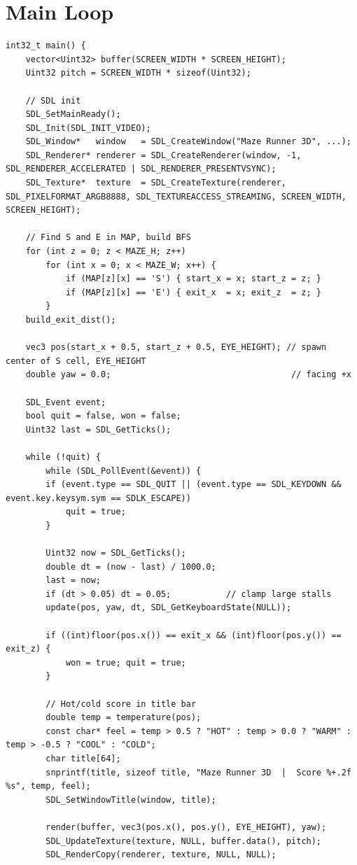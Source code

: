 {{{{{{\section{Main Loop}
\label{sec:mainloop}
\begin{verbatim}
int32_t main() {
    vector<Uint32> buffer(SCREEN_WIDTH * SCREEN_HEIGHT);
    Uint32 pitch = SCREEN_WIDTH * sizeof(Uint32);

    // SDL init
    SDL_SetMainReady();
    SDL_Init(SDL_INIT_VIDEO);
    SDL_Window*   window   = SDL_CreateWindow("Maze Runner 3D", ...);
    SDL_Renderer* renderer = SDL_CreateRenderer(window, -1, SDL_RENDERER_ACCELERATED | SDL_RENDERER_PRESENTVSYNC);
    SDL_Texture*  texture  = SDL_CreateTexture(renderer, SDL_PIXELFORMAT_ARGB8888, SDL_TEXTUREACCESS_STREAMING, SCREEN_WIDTH, SCREEN_HEIGHT);

    // Find S and E in MAP, build BFS
    for (int z = 0; z < MAZE_H; z++)
        for (int x = 0; x < MAZE_W; x++) {
            if (MAP[z][x] == 'S') { start_x = x; start_z = z; }
            if (MAP[z][x] == 'E') { exit_x  = x; exit_z  = z; }
        }
    build_exit_dist();

    vec3 pos(start_x + 0.5, start_z + 0.5, EYE_HEIGHT); // spawn center of S cell, EYE_HEIGHT
    double yaw = 0.0;                                    // facing +x

    SDL_Event event;
    bool quit = false, won = false;
    Uint32 last = SDL_GetTicks();

    while (!quit) {
        while (SDL_PollEvent(&event)) {
        if (event.type == SDL_QUIT || (event.type == SDL_KEYDOWN && event.key.keysym.sym == SDLK_ESCAPE))
            quit = true;
        }

        Uint32 now = SDL_GetTicks();
        double dt = (now - last) / 1000.0;
        last = now;
        if (dt > 0.05) dt = 0.05;           // clamp large stalls
        update(pos, yaw, dt, SDL_GetKeyboardState(NULL));

        if ((int)floor(pos.x()) == exit_x && (int)floor(pos.y()) == exit_z) {
            won = true; quit = true;
        }

        // Hot/cold score in title bar
        double temp = temperature(pos);
        const char* feel = temp > 0.5 ? "HOT" : temp > 0.0 ? "WARM" : temp > -0.5 ? "COOL" : "COLD";
        char title[64];
        snprintf(title, sizeof title, "Maze Runner 3D  |  Score %+.2f  %s", temp, feel);
        SDL_SetWindowTitle(window, title);

        render(buffer, vec3(pos.x(), pos.y(), EYE_HEIGHT), yaw);
        SDL_UpdateTexture(texture, NULL, buffer.data(), pitch);
        SDL_RenderCopy(renderer, texture, NULL, NULL);


\end{verbatim}}}}}}}
